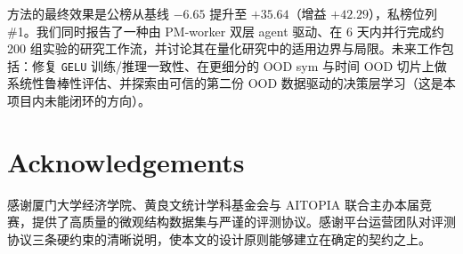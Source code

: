 \documentclass[11pt]{article}
\begin{document}
方法的最终效果是公榜从基线 $-6.65$ 提升至 $+35.64$（增益 $+42.29$），私榜位列 \#1。我们同时报告了一种由 PM-worker 双层 agent 驱动、在 6 天内并行完成约 200 组实验的研究工作流，并讨论其在量化研究中的适用边界与局限。未来工作包括：修复 \texttt{GELU} 训练/推理一致性、在更细分的 OOD sym 与时间 OOD 切片上做系统性鲁棒性评估、并探索由可信的第二份 OOD 数据驱动的决策层学习（这是本项目内未能闭环的方向）。

\section*{Acknowledgements}

感谢厦门大学经济学院、黄良文统计学科基金会与 AITOPIA 联合主办本届竞赛，提供了高质量的微观结构数据集与严谨的评测协议。感谢平台运营团队对评测协议三条硬约束的清晰说明，使本文的设计原则能够建立在确定的契约之上。
\end{document}
